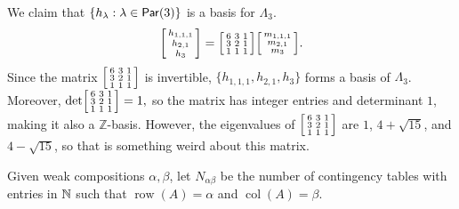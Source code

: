 \begin{example}[Theorem~\ref{thm:hn_sym}\ref{item:hl_symd_basis} for \(d = 3\)]
    We claim that \(\{h_{\lambda} : \lambda \in \operatorname{\mathsf{Par}}(3)\}\) is a basis for \(\Lambda_3\).
    \[
        \begin{bsmallmatrix}
            h_{1,1,1} \\
            h_{2,1}   \\
            h_3
        \end{bsmallmatrix}
        =
        \begin{bsmallmatrix}
            6 & 3 & 1 \\
            3 & 2 & 1 \\
            1 & 1 & 1
        \end{bsmallmatrix}
        \begin{bsmallmatrix}
            m_{1,1,1} \\
            m_{2,1}   \\
            m_3
        \end{bsmallmatrix}.
    \]
    Since the matrix
		\(
        \begin{bsmallmatrix}
            6 & 3 & 1 \\
            3 & 2 & 1 \\
            1 & 1 & 1
        \end{bsmallmatrix}
    \)
    is invertible, \(\{h_{1,1,1}, h_{2,1}, h_3\}\) forms a basis of \(\Lambda_3\). Moreover,
		\(
        \det\begin{bsmallmatrix}
            6 & 3 & 1 \\
            3 & 2 & 1 \\
            1 & 1 & 1
        \end{bsmallmatrix} = 1,
    \)
    so the matrix has integer entries and determinant \(1\), making it also a \(\mathbb{Z}\)-basis.
		However, the eigenvalues of
		\(
				\begin{bsmallmatrix}
						6 & 3 & 1 \\
						3 & 2 & 1 \\
						1 & 1 & 1
				\end{bsmallmatrix}
		\)
		are \(1\), \(4 + \sqrt{15}\), and \(4 - \sqrt{15}\),
		so that is something weird about this matrix.
\end{example}

Given weak compositions \(\alpha, \beta\),
let \(N_{\alpha\beta}\) be the number of contingency tables with entries in \(\mathbb{N}\) such that \(\operatorname{row}(A) = \alpha\) and \(\operatorname{col}(A) = \beta\).

